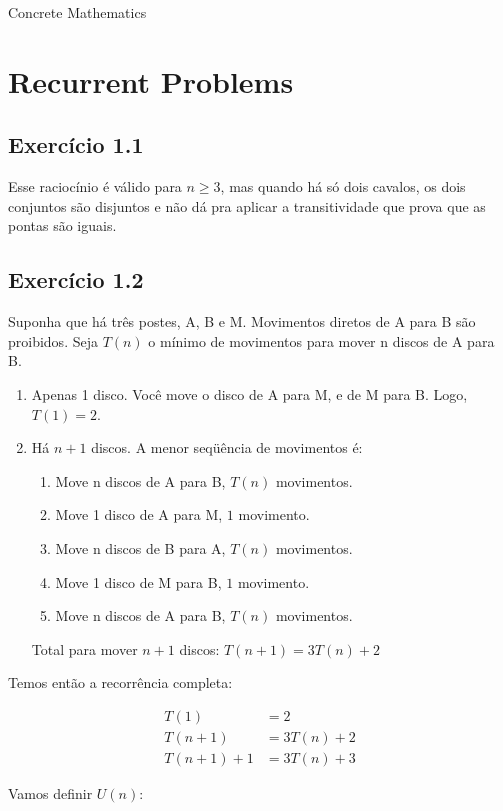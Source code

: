 \documentclass[10pt]{book}
\begin{document}
Concrete Mathematics

\chapter{Recurrent Problems}

\section{Exercício 1.1}

Esse raciocínio é válido para $n\geq3$, mas quando há só dois cavalos, os dois conjuntos são disjuntos e não dá pra aplicar a transitividade que prova que as pontas são iguais.

\section{Exercício 1.2}

Suponha que há três postes, A, B e M. Movimentos diretos de A para B são proibidos. Seja $T(n)$ o mínimo de movimentos para mover n discos de A para B.

\begin{enumerate}
  \item Apenas 1 disco.
  Você move o disco de A para M, e de M para B. Logo, $T(1)=2$.

  \item Há $n+1$ discos. A menor seqüência de movimentos é:
  \begin{enumerate}
    \item Move n discos de A para B, $T(n)$ movimentos.
    \item Move 1 disco de A para M, $1$ movimento.
    \item Move n discos de B para A, $T(n)$ movimentos.
    \item Move 1 disco de M para B, $1$ movimento.
    \item Move n discos de A para B, $T(n)$ movimentos.
  \end{enumerate}
  Total para mover $n+1$ discos: $T(n+1) = 3T(n)+2$
\end{enumerate}

Temos então a recorrência completa:

\begin{align*}
   T(1)&=2 \\
   T(n+1)&=3T(n)+2 \\
   T(n+1)+1&=3T(n)+3 
\end{align*}

Vamos definir $U(n)$: 
\end{document}
